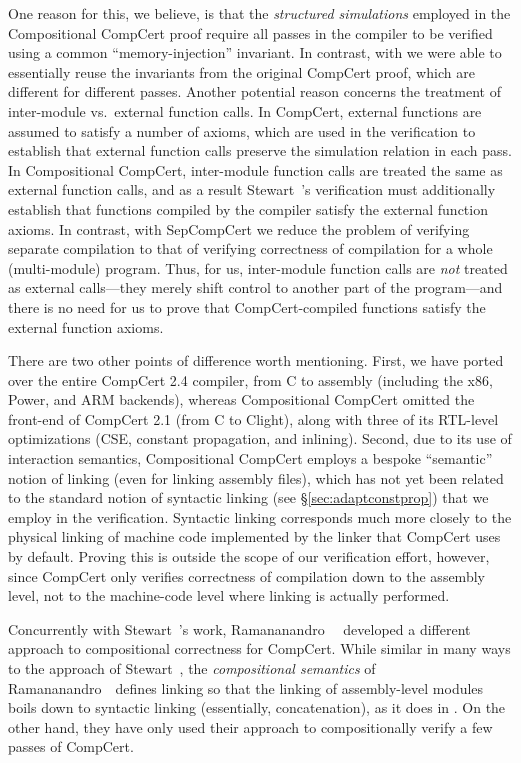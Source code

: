 One reason for this, we believe, is that the \emph{structured
  simulations} employed in the Compositional CompCert proof require
all passes in the compiler to be verified using a common
``memory-injection'' invariant.  In contrast, with \sepcomp{} we were
able to essentially reuse the invariants from the original CompCert
proof, which are different for different passes.  Another potential
reason concerns the treatment of inter-module vs.\ external function
calls.  In CompCert, external functions are assumed to satisfy a
number of axioms, which are used in the verification to establish that
external function calls preserve the simulation relation in each pass.
In Compositional CompCert, inter-module function calls are treated the
same as external function calls, and as a result Stewart~\etal's
verification must additionally establish that functions compiled by
the compiler satisfy the external function axioms.  In contrast, with
SepCompCert we reduce the problem of verifying separate compilation to
that of verifying correctness of compilation for a whole
(multi-module) program.  Thus, for us, inter-module function calls are
\emph{not} treated as external calls---they merely shift control to
another part of the program---and there is no need for us to prove
that CompCert-compiled functions satisfy the external function axioms.

There are two other points of difference worth mentioning.  First, we
have ported over the entire CompCert 2.4 compiler, from C to assembly
(including the x86, Power, and ARM backends), whereas Compositional
CompCert omitted the front-end of CompCert 2.1 (from C to Clight),
along with three of its RTL-level optimizations (CSE, constant
propagation, and inlining).  Second, due to its use of interaction
semantics, Compositional CompCert employs a bespoke ``semantic''
notion of linking (even for linking assembly files), which has not yet
been related to the standard notion of syntactic linking (see
\S\ref{sec:adaptconstprop}) that we employ in the \sepcomp{}
verification.  Syntactic linking corresponds much more closely to the
physical linking of machine code implemented by the  linker
that CompCert uses by default.  Proving this is outside the scope of
our verification effort, however, since CompCert only verifies
correctness of compilation down to the assembly level, not to the
machine-code level where linking is actually performed.

Concurrently with Stewart~\etal's work, Ramananandro~\etal~\cite{ramananandro+:cpp2015}
developed a different approach to compositional correctness for
CompCert.  While similar in many ways to the approach of
Stewart~\etal, the \emph{compositional semantics} of
Ramananandro~\etal\ defines linking so that the linking of
assembly-level modules boils down to syntactic linking (essentially,
concatenation), as it does in \sepcomp{}.  On the other hand, they
have only used their approach to compositionally verify a few passes
of CompCert.


